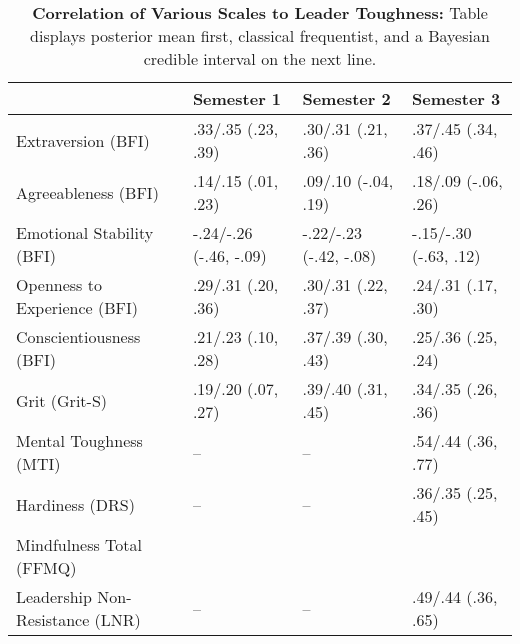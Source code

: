\begin{table}[ht]
\centering
\begin{tabular}{llll}
  \hline
 & Semester 1 & Semester 2 & Semester 3 \\ 
  \hline
Extraversion (BFI) & .33/.35 (.23, .39) & .30/.31 (.21, .36) & .37/.45 (.34, .46) \\ 
  Agreeableness (BFI) & .14/.15 (.01, .23) & .09/.10 (-.04, .19) & .18/.09 (-.06, .26) \\ 
  Emotional Stability (BFI) & -.24/-.26 (-.46, -.09) & -.22/-.23 (-.42, -.08) & -.15/-.30 (-.63, .12) \\ 
  Openness to Experience (BFI) & .29/.31 (.20, .36) & .30/.31 (.22, .37) & .24/.31 (.17, .30) \\ 
  Conscientiousness (BFI) & .21/.23 (.10, .28) & .37/.39 (.30, .43) & .25/.36 (.25, .24) \\ 
  Grit (Grit-S) & .19/.20 (.07, .27) & .39/.40 (.31, .45) & .34/.35 (.26, .36) \\ 
  Mental Toughness (MTI) & -- & -- & .54/.44 (.36, .77) \\ 
  Hardiness (DRS) & -- & -- & .36/.35 (.25, .45) \\ 
  Mindfulness Total (FFMQ) &  &  &  \\ 
  Leadership Non-Resistance (LNR) & -- & -- & .49/.44 (.36, .65) \\ 
   \hline
\end{tabular}
\caption{\textbf{Correlation of Various Scales to Leader Toughness:} Table displays posterior mean first, classical frequentist, and a Bayesian credible interval on the next line.} 
\label{tab:pers_corr}
\end{table}

